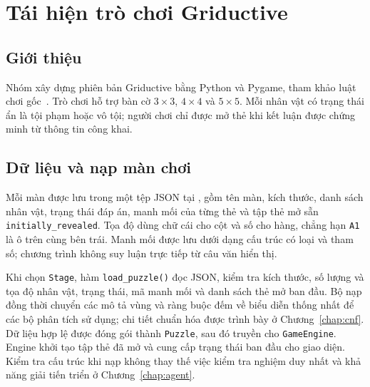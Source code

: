 \chapter{Tái hiện trò chơi Griductive}
\label{chap:game}

\section{Giới thiệu}
Nhóm xây dựng phiên bản Griductive bằng Python và Pygame, tham khảo luật chơi gốc~\cite{griductive,pygameDocs}. Trò chơi hỗ trợ bàn cờ $3\times3$, $4\times4$ và $5\times5$. Mỗi nhân vật có trạng thái ẩn là tội phạm hoặc vô tội; người chơi chỉ được mở thẻ khi kết luận được chứng minh từ thông tin công khai.

\section{Dữ liệu và nạp màn chơi}
\label{sec:game-loading}
Mỗi màn được lưu trong một tệp JSON tại , gồm tên màn, kích thước, danh sách nhân vật, trạng thái đáp án, manh mối của từng thẻ và tập thẻ mở sẵn \texttt{initially\_revealed}. Tọa độ dùng chữ cái cho cột và số cho hàng, chẳng hạn \texttt{A1} là ô trên cùng bên trái. Manh mối được lưu dưới dạng cấu trúc có loại và tham số; chương trình không suy luận trực tiếp từ câu văn hiển thị.

Khi chọn \texttt{Stage}, hàm \texttt{load\_puzzle()} đọc JSON, kiểm tra kích thước, số lượng và tọa độ nhân vật, trạng thái, mã manh mối và danh sách thẻ mở ban đầu. Bộ nạp đồng thời chuyển các mô tả vùng và ràng buộc đếm về biểu diễn thống nhất để các bộ phân tích sử dụng; chi tiết chuẩn hóa được trình bày ở Chương~\ref{chap:cnf}. Dữ liệu hợp lệ được đóng gói thành \texttt{Puzzle}, sau đó truyền cho \texttt{GameEngine}. Engine khởi tạo tập thẻ đã mở và cung cấp trạng thái ban đầu cho giao diện. Kiểm tra cấu trúc khi nạp không thay thế việc kiểm tra nghiệm duy nhất và khả năng giải tiến triển ở Chương~\ref{chap:agent}.


